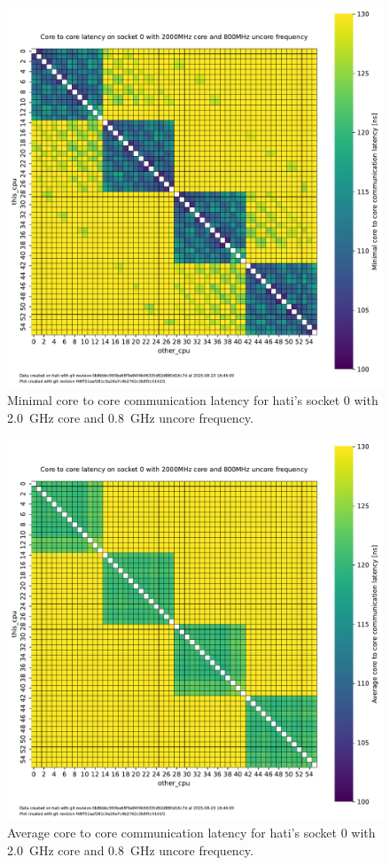 \begin{figure}[]
    \centering
    \includegraphics[width=\columnwidth]{fig/core-to-core-latency/core-to-core-heatmap-min-2000-800.pdf}
    \caption{Minimal core to core communication latency for hati's socket 0 with \SI{2.0}{\GHz} core and \SI{0.8}{\GHz} uncore frequency.}
\end{figure}
\begin{figure}[]
    \centering
    \includegraphics[width=\columnwidth]{fig/core-to-core-latency/core-to-core-heatmap-avg-2000-800.pdf}
    \caption{Average core to core communication latency for hati's socket 0 with \SI{2.0}{\GHz} core and \SI{0.8}{\GHz} uncore frequency.}
\end{figure}
